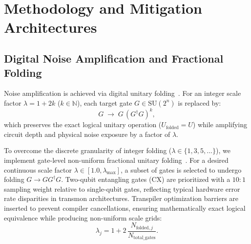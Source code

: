 \documentclass[10pt,twocolumn,a4paper]{article}
\begin{document}
\section{Methodology and Mitigation Architectures}

\subsection{Digital Noise Amplification and Fractional Folding}
Noise amplification is achieved via digital unitary folding~\cite{giurgica2020}. For an integer scale factor $\lambda = 1 + 2k$ ($k \in \mathbb{N}$), each target gate $G \in \mathrm{SU}(2^n)$ is replaced by:
\begin{equation}
G \;\longrightarrow\; G\,(G^\dagger G)^k,
\label{eq:integer_folding}
\end{equation}
which preserves the exact logical unitary operation ($U_{\mathrm{folded}} = U$) while amplifying circuit depth and physical noise exposure by a factor of $\lambda$.

To overcome the discrete granularity of integer folding ($\lambda \in \{1, 3, 5, \dots\}$), we implement gate-level non-uniform fractional unitary folding~\cite{giurgica2020}. For a desired continuous scale factor $\lambda \in [1.0, \lambda_{\max}]$, a subset of gates is selected to undergo folding $G \to G G^\dagger G$. Two-qubit entangling gates ($\mathrm{CX}$) are prioritized with a $10:1$ sampling weight relative to single-qubit gates, reflecting typical hardware error rate disparities in transmon architectures. Transpiler optimization barriers are inserted to prevent compiler cancellations, ensuring mathematically exact logical equivalence while producing non-uniform scale grids:
\begin{equation}
\lambda_j = 1 + 2\,\frac{N_{\mathrm{folded}, j}}{N_{\mathrm{total\_gates}}}.
\end{equation}
\end{document}
